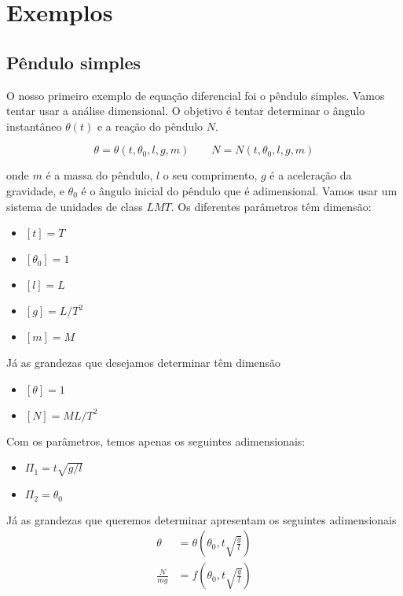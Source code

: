 \section{Exemplos}

\subsection{Pêndulo simples}

O nosso primeiro exemplo de equação diferencial foi o pêndulo simples. Vamos tentar usar a análise dimensional. O objetivo é tentar determinar o ângulo instantâneo $\theta(t)$ e a reação do pêndulo $N$.

\[
\theta = \theta(t, \theta_0, l, g, m) \qquad N = N(t, \theta_0, l, g, m)
\]

onde $m$ é a massa do pêndulo, $l$ o seu comprimento, $g$ é a aceleração da gravidade, e $\theta_0$ é o ângulo inicial do pêndulo que é adimensional. Vamos usar um sistema de unidades de class $LMT$. Os diferentes parâmetros têm dimensão:

\begin{itemize}
\item $[t] = T$
\item $[\theta_0] = 1$
\item $[l] = L$
\item $[g] = L/T^2$
\item $[m] = M$
\end{itemize}
Já as grandezas que desejamos determinar têm dimensão
\begin{itemize}
\item $[\theta] = 1$
\item $[N] = ML/T^2$
\end{itemize}

Com os parâmetros, temos apenas os seguintes adimensionais:
\begin{itemize}
\item $\Pi_1 = t\sqrt{g/l}$
\item $\Pi_2 = \theta_0$
\end{itemize}

Já as grandezas que queremos determinar apresentam os seguintes adimensionais
\[
\begin{aligned}
  \theta &= \theta\left(\theta_0, t\sqrt{ \frac{g}{l} }\right) \\
  \frac{N}{mg} &= f\left(\theta_0, t\sqrt{ \frac{g}{l} }\right) \\
\end{aligned}
\]

